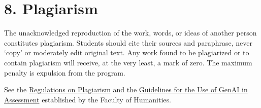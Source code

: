 \documentclass[11pt,a4paper]{article}
\begin{document}
\section{8. Plagiarism}

The unacknowledged reproduction of the work, words, or ideas of another person constitutes plagiarism. Students should cite their sources and paraphrase, never `copy' or moderately edit original text. Any work found to be plagiarized or to contain plagiarism will receive, at the very least, a mark of zero. The maximum penalty is expulsion from the program.

See the \href{https://www.organisatiegids.universiteitleiden.nl/en/regulations/general/plagiarism}{Regulations on Plagiarism} and the \href{https://www.organisatiegids.universiteitleiden.nl/en/regulations/humanities/guidelines-for-the-use-of-genai-in-assessment}{Guidelines for the Use of GenAI in Assessment} established by the Faculty of Humanities.
\end{document}
